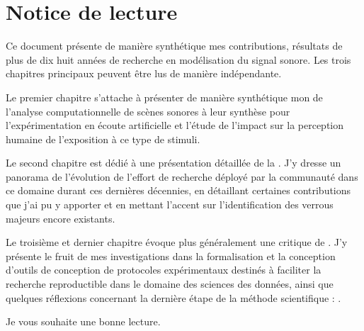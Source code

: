 \chapter{\nmu Notice \nmu de lecture} \label{chap:notice}

Ce document présente de manière synthétique mes contributions, résultats de plus de dix huit années de recherche en modélisation du signal sonore. Les trois chapitres principaux peuvent être lus de manière indépendante.

Le premier chapitre s'attache à présenter de manière synthétique mon  de l'analyse computationnelle de scènes sonores à leur synthèse pour l'expérimentation en écoute artificielle et l'étude de l'impact sur la perception humaine de l'exposition à ce type de stimuli.

Le second chapitre est dédié à une présentation détaillée de la . J'y dresse un panorama de l'évolution de l'effort de recherche déployé par la communauté dans ce domaine durant ces dernières décennies, en détaillant certaines contributions que j'ai pu y apporter et en mettant l'accent sur l'identification des verrous majeurs encore existants.

Le troisième et dernier chapitre évoque plus généralement une critique de . J'y présente le fruit de mes investigations dans la formalisation et la conception d'outils de conception de protocoles expérimentaux destinés à faciliter la recherche reproductible dans le domaine des sciences des données, ainsi que quelques réflexions concernant la dernière étape de la méthode scientifique : .


Je vous souhaite une bonne lecture.

